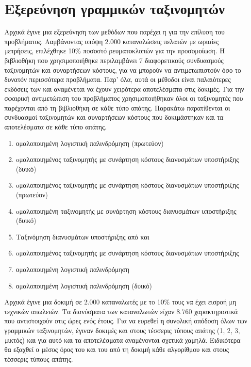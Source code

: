 \section{Εξερεύνηση γραμμικών ταξινομητών}
Αρχικά έγινε μια εξερεύνηση των μεθόδων που παρέχει η  για την επίλυση του προβλήματος. Λαμβάνοντας υπόψη 2.000 καταναλώσεις πελατών με ωριαίες μετρήσεις, επιλέχθηκε 10\% ποσοστό ρευματοκλοπών για την προσομοίωση. Η βιβλιοθήκη που χρησιμοποιήθηκε περιλαμβάνει 7 διαφορετικούς συνδυασμούς ταξινομητών και συναρτήσεων κόστους, για να μπορούν να αντιμετωπιστούν όσο το δυνατόν περισσότερα προβλήματα. Παρ' όλα, αυτά οι μέθοδοι  είναι παλαιότερες εκδόσεις των  και αναμένεται να έχουν χειρότερα αποτελέσματα στις δοκιμές. Για την σφαιρική αντιμετώπιση του προβλήματος χρησιμοποιήθηκαν όλοι οι ταξινομητές που παρέχονται από τη βιβλιοθήκη σε κάθε τύπο απάτης. Παρακάτω παρατίθενται οι συνδυασμοί ταξινομητών και συναρτήσεων κόστους που δοκιμάστηκαν και τα αποτελέσματα σε κάθε τύπο απάτης.\par
\begin{enumerate}
\item {} ομαλοποιημένη λογιστική παλινδρόμηση (πρωτεύον)
\item {} oμαλοποιημένος ταξινομητής με  συνάρτηση κόστους διανυσμάτων υποστήριξης (δυικό)
\item {} oμαλοποιημένος ταξινομητής με  συνάρτηση κόστους διανυσμάτων υποστήριξης (πρωτεύον)
\item {} oμαλοποιημένη ταξινομητής με  συνάρτηση κόστους διανυσμάτων υποστήριξης (δυικό)
\item Ταξινόμηση διανυσμάτων υποστήριξης από  και 
\item {} oμαλοποιημένος ταξινομητής με  συνάρτηση κόστους διανυσμάτων υποστήριξης
\item {} ομαλοποιημένη λογιστική παλινδρόμηση
\item {} ομαλοποιημένη λογιστική παλινδρόμηση (δυικό)
\end{enumerate}
\par Αρχικά έγινε μια δοκιμή σε 2.000 καταναλωτές με το 10\% τους να έχει εισροή μη τεχνικών απωλειών. Τα διανύσματα των καταναλωτών είχαν 8.760 χαρακτηριστικά που αντιστοιχούν στις ώρες ενός έτους. Για να ευρεθεί η συνολική απόδοση όλων των γραμμικών ταξινομητών, έγιναν δοκιμές και στους τέσσερις τύπους απάτης (1, 2, 3, μικτός) και για αυτό και τα αποτελέσματα αναμένονται σχετικά χαμηλά. Ειδικότερα θα εξαχθεί ο μέσος όρος του  και του  από τη δοκιμή κάθε αλγορίθμου και στους τέσσερις τύπους απάτης.\par
